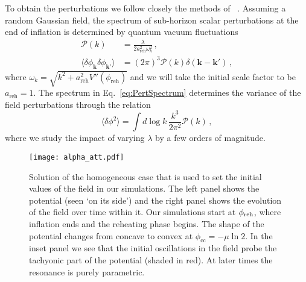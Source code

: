 \documentclass[
    reprint,
    preprintnumbers,
    superscriptaddress,
    nofootinbib,
     amsmath,amssymb,
     aps,
     prd,
    floatfix,
    ]{revtex4-2}
\newcommand{\reh}{_\mathrm{reh}}
\begin{document}
To obtain the perturbations we follow closely the methods of ~\cite{Figueroa:2020rrl}. Assuming a random Gaussian field, the spectrum of sub-horizon scalar perturbations at the end of inflation is determined by quantum vacuum fluctuations
\begin{align}
\label{eq:PertSpectrum}
\mathcal{P}(k) &= \frac{\lambda}{2 a\reh^2 \omega_k^2} \,, \\
\langle \delta\phi_\mathbf{k} \delta\phi_{\mathbf{k}'} \rangle &= (2\pi)^3 \mathcal{P}(k) \delta(\mathbf{k}-\mathbf{k}') \,,
\end{align}
where $\omega_k = \sqrt{k^2 + a\reh^2 V''(\phi\reh)}$ and we will take the initial scale factor to be $a\reh=1$. The spectrum in Eq.~\eqref{eq:PertSpectrum} determines the variance of the field perturbations through the relation
\begin{equation}
\langle \delta\phi^2 \rangle = \int d\log k \, \frac{k^3}{2 \pi^2} \mathcal{P}(k) \,,
\end{equation}
where we study the impact of varying $\lambda$ by a few orders of magnitude.

\begin{figure}[t!]
    \centering
\texttt{[image: alpha\_att.pdf]}
\caption{Solution of the homogeneous case that is used to set the initial values of the field in our simulations. The left panel shows the potential (seen `on its side') and the right panel shows the evolution of the field over time within it. Our simulations start at $\phi_{\rm reh}$, where inflation ends and the reheating phase begins. The shape of the potential changes from concave to convex at $\phi_\mathrm{cc}=-\mu\ln 2$. In the inset panel we see that the initial oscillations in the field probe the tachyonic part of the potential (shaded in red). At later times the resonance is purely parametric.}
\label{fig:homogeneous}
\end{figure}
\end{document}
